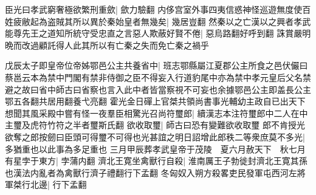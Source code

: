 臣光曰孝武窮奢極欲繁刑重歛|{
	歛力驗翻}
内侈宫室外事四夷信惑神怪巡遊無度使百姓疲敝起為盗賊其所以異於秦始皇者無幾矣|{
	幾居豈翻}
然秦以之亡漢以之興者孝武能尊先王之道知所統守受忠直之言惡人欺蔽好賢不倦|{
	惡烏路翻好呼到翻}
誅賞嚴明晩而改過顧託得人此其所以有亡秦之失而免亡秦之禍乎

戊辰太子即皇帝位帝姊鄂邑公主共養省中|{
	班志鄂縣屬江夏郡公主所食之邑伏儼曰蔡邕云本為禁中門閣有禁非侍御之臣不得妄入行道豹尾中亦為禁中孝元皇后父名禁避之故曰省中師古曰省察也言入此中者皆當察視不可妄也余據鄂邑公主即盖長公主鄂五各翻共居用翻養弋亮翻}
霍光金日磾上官桀共領尚書事光輔幼主政自已出天下想聞其風采殿中嘗有怪一夜羣臣相驚光召尚符璽郎|{
	續漢志本注符璽郎中二人在中主璽及虎符竹符之半者璽斯氏翻}
欲收取璽|{
	師古曰恐有變難欲收取璽}
郎不肯授光欲奪之郎按劒曰臣頭可得璽不可得也光甚誼之明日詔增此郎秩二等衆庶莫不多光|{
	多猶重也以此事為多足重也}
三月甲辰葬孝武皇帝于茂陵　夏六月赦天下　秋七月有星孛于東方|{
	孛蒲内翻}
濟北王寛坐禽獸行自殺|{
	淮南厲王子勃徙封濟北王寛其孫也漢法内亂者為禽獸行濟子禮翻行下孟翻}
冬匈奴入朔方殺畧吏民發軍屯西河左將軍桀行北邊|{
	行下孟翻}


